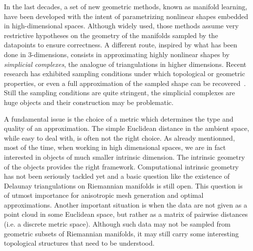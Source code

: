
In the last decades, a set of new geometric methods, known as manifold learning, have been developed with the intent of parametrizing nonlinear shapes embedded in high-dimensional spaces. Although widely used, those methods  assume very restrictive hypotheses on the geometry of the manifolds sampled by the datapoints to ensure correctness. 
A different route, inspired by what has been done in 3-dimensions, consists in approximating highly nonlinear shapes by {\em simplicial complexes}, the analogue of triangulations in higher dimensions. Recent research has exhibited sampling conditions under which  topological or geometric properties, or even a full approximation of the sampled shape can be recovered~\cite{nsw-fhm-2008,geometrica-ccl09,geometrica-7142i}. Still the sampling conditions are quite stringent, the simplicial complexes are huge objects and their construction may be problematic.  

A fundamental issue is the choice of a metric which determines the type and quality of an approximation.
 The simple Euclidean distance in the ambient space, while easy to deal with, is often not the right choice.  As already mentionned, most of the time, when working in high dimensional spaces, we are in fact interested in objects of much smaller intrinsic dimension. The intrinsic geometry of the objects provides the right framework. Computational intrinsic geometry has not been seriously tackled yet and a basic question like the existence of  Delaunay triangulations on Riemannian manifolds is still open.  This question is of utmost importance for anisotropic mesh generation and optimal approximations. Another important situation is when the data are not given as a point cloud in some Euclidean space, but rather as a matrix of pairwise distances (i.e. a discrete metric space). Although such data may not be sampled from geometric subsets of Riemannian manifolds, it may still carry some interesting topological structures that need to be understood. 

